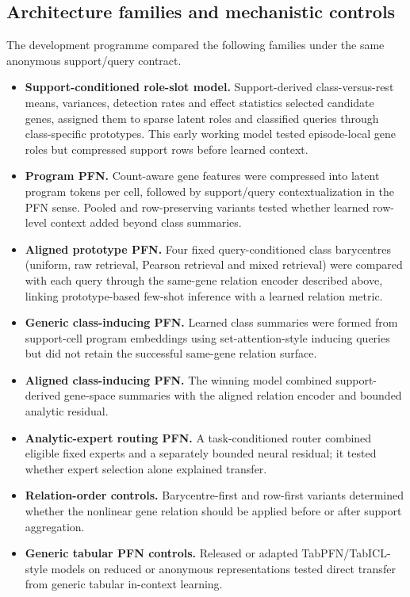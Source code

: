 \documentclass[12pt]{article}
\begin{document}
\subsection*{Architecture families and mechanistic controls}

The development programme compared the following families under the same anonymous support/query contract.

\begin{itemize}
\item \textbf{Support-conditioned role-slot model.} Support-derived class-versus-rest means, variances, detection rates and effect statistics selected candidate genes, assigned them to sparse latent roles and classified queries through class-specific prototypes. This early working model tested episode-local gene roles but compressed support rows before learned context.
\item \textbf{Program PFN.} Count-aware gene features were compressed into latent program tokens per cell, followed by support/query contextualization in the PFN sense\cite{muller2022pfn,hollmann2025tabpfn}. Pooled and row-preserving variants tested whether learned row-level context added beyond class summaries.
\item \textbf{Aligned prototype PFN.} Four fixed query-conditioned class barycentres (uniform, raw retrieval, Pearson retrieval and mixed retrieval) were compared with each query through the same-gene relation encoder described above, linking prototype-based few-shot inference with a learned relation metric\cite{snell2017prototypical,sung2018relation}.
\item \textbf{Generic class-inducing PFN.} Learned class summaries were formed from support-cell program embeddings using set-attention-style inducing queries\cite{lee2019settransformer,jaegle2021perceiver} but did not retain the successful same-gene relation surface.
\item \textbf{Aligned class-inducing PFN.} The winning model combined support-derived gene-space summaries with the aligned relation encoder and bounded analytic residual.
\item \textbf{Analytic-expert routing PFN.} A task-conditioned router combined eligible fixed experts and a separately bounded neural residual; it tested whether expert selection alone explained transfer.
\item \textbf{Relation-order controls.} Barycentre-first and row-first variants determined whether the nonlinear gene relation should be applied before or after support aggregation.
\item \textbf{Generic tabular PFN controls.} Released or adapted TabPFN/TabICL-style models on reduced or anonymous representations tested direct transfer from generic tabular in-context learning\cite{hollmann2025tabpfn,qu2026tabiclv2}.
\end{itemize}
\end{document}
